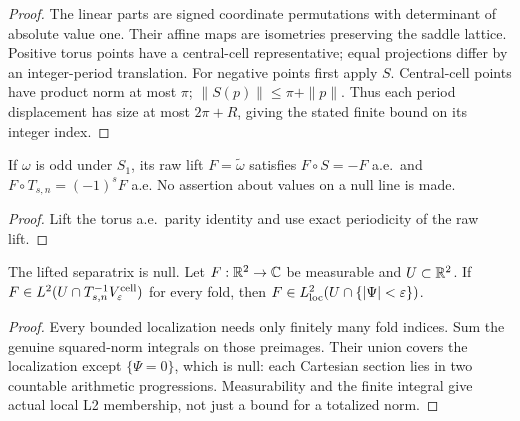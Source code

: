 \begin{proof}
\leanok
The linear parts are signed coordinate permutations with determinant of
absolute value one. Their affine maps are isometries preserving the saddle
lattice. Positive torus points have a central-cell representative;
equal projections differ by an integer-period translation. For negative
points first apply $S$.
Central-cell points have product norm at most $\pi$;
$\|S(p)\|\le\pi+\|p\|$. Thus each period displacement has size at most
$2\pi+R$, giving the stated finite bound on its integer index.
\end{proof}

\begin{lemma}
\label{lem:odd-odd-cell-fold-parity}
\leanok
If $\omega$ is odd under $S_1$, its raw lift $F=\widetilde\omega$ satisfies
$F\circ S=-F$ a.e.\ and $F\circ T_{s,n}=(-1)^sF$ a.e.
No assertion about values on a null line is made.
\end{lemma}

\begin{proof}
\leanok
Lift the torus a.e.\ parity identity and use exact periodicity of the raw lift.
\end{proof}

\begin{lemma}
\label{lem:cell-fold-l2-cover}
\leanok
The lifted separatrix is null.
Let $F:\mathbb{R}^2\to\mathbb{C}$ be measurable and $U\subset\mathbb{R}^2$.
If $F\in L^2(U\cap T_{s,n}^{-1}V_\varepsilon^{\rm cell})$ for every fold,
then $F\in L^2_{\rm loc}(U\cap\{|\Psi|<\varepsilon\})$.
\end{lemma}

\begin{proof}
\leanok
Every bounded localization needs only finitely many fold indices.
Sum the genuine squared-norm integrals on those preimages.
Their union covers the localization except $\{\Psi=0\}$, which is null:
each Cartesian section lies in two countable arithmetic progressions.
Measurability and the finite integral give actual local L2 membership,
not just a bound for a totalized norm.
\end{proof}

